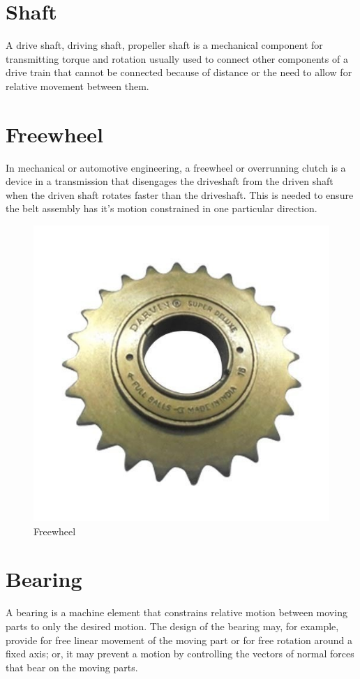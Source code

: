\section{Shaft} \label{Shaft}
A drive shaft, driving shaft, propeller shaft is a mechanical component for transmitting torque and rotation usually used to connect other components of a drive train that cannot be connected because of distance or the need to allow for relative movement between them.




\section{Freewheel} \label{Freewheel}
 
In mechanical or automotive engineering, a freewheel or overrunning clutch is a device in a transmission that disengages the driveshaft from the driven shaft when the driven shaft rotates faster than the driveshaft. This is needed to ensure the belt assembly has it's motion constrained in one particular direction.
\begin{figure}[h!]
\center
\includegraphics[scale=0.5]{24tfreewheelgear}
\caption{Freewheel}
\end{figure}


\section{Bearing
} \label{Bearing}
A bearing is a machine element that constrains relative motion between moving parts to only the desired motion. The design of the bearing may, for example, provide for free linear movement of the moving part or for free rotation around a fixed axis; or, it may prevent a motion by controlling the vectors of normal forces that bear on the moving parts.



